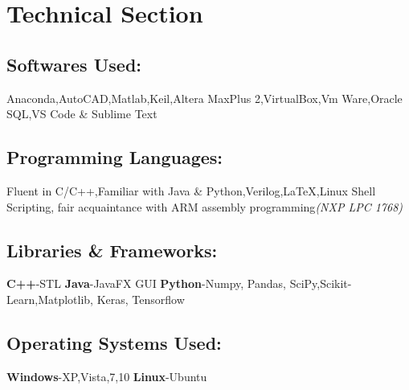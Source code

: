 \documentclass{article}
\begin{document}
\section*{Technical Section}
        \subsection*{Softwares Used:}
        Anaconda,AutoCAD,Matlab,Keil,Altera MaxPlus 2,VirtualBox,Vm Ware,Oracle SQL,VS Code \& Sublime Text 
        \subsection*{Programming Languages:}
        Fluent in C/C++,Familiar with Java \& Python,Verilog,{\LaTeX},Linux Shell Scripting,
        fair acquaintance with ARM assembly programming\textit{(NXP LPC 1768)}
        \subsection*{Libraries \& Frameworks:}
            \textbf{C++}-STL    
            \textbf{Java}-JavaFX GUI
            \textbf{Python}-Numpy, Pandas, SciPy,Scikit-Learn,Matplotlib, Keras, Tensorflow    
        \subsection*{Operating Systems Used:}
        \textbf{Windows}-XP,Vista,7,10 
        \textbf{Linux}-Ubuntu
\end{document}
